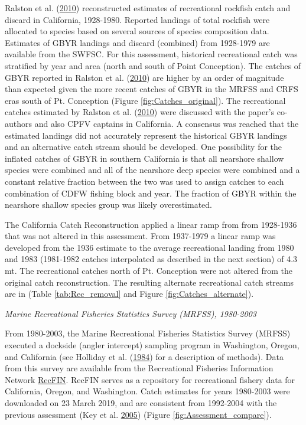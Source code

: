 \documentclass[12pt,]{article}
\begin{document}
Ralston et al. (\protect\hyperlink{ref-Ralston2010}{2010}) reconstructed
estimates of recreational rockfish catch and discard in California,
1928-1980. Reported landings of total rockfish were allocated to species
based on several sources of species composition data. Estimates of GBYR
landings and discard (combined) from 1928-1979 are available from the
SWFSC. For this assessment, historical recreational catch was stratified
by year and area (north and south of Point Conception). The catches of
GBYR reported in Ralston et al.
(\protect\hyperlink{ref-Ralston2010}{2010}) are higher by an order of
magnitude than expected given the more recent catches of GBYR in the
MRFSS and CRFS eras south of Pt. Conception (Figure
\ref{fig:Catches_original}). The recreational catches estimated by
Ralston et al. (\protect\hyperlink{ref-Ralston2010}{2010}) were
discussed with the paper's co-authors and also CPFV captains in
California. A consensus was reached that the estimated landings did not
accurately represent the historical GBYR landings and an alternative
catch stream should be developed. One possibility for the inflated
catches of GBYR in southern California is that all nearshore shallow
species were combined and all of the nearshore deep species were
combined and a constant relative fraction between the two was used to
assign catches to each combination of CDFW fishing block and year. The
fraction of GBYR within the nearshore shallow species group was likely
overestimated.

The California Catch Reconstruction applied a linear ramp from from
1928-1936 that was not altered in this assessment. From 1937-1979 a
linear ramp was developed from the 1936 estimate to the average
recreational landing from 1980 and 1983 (1981-1982 catches interpolated
as described in the next section) of 4.3 mt. The recreational catches
north of Pt. Conception were not altered from the original catch
reconstruction. The resulting alternate recreational catch streams are
in (Table \ref{tab:Rec_removal} and Figure \ref{fig:Catches_alternate}).

\emph{Marine Recreational Fisheries Statistics Survey (MRFSS),
1980-2003}

From 1980-2003, the Marine Recreational Fisheries Statistics Survey
(MRFSS) executed a dockside (angler intercept) sampling program in
Washington, Oregon, and California (see Holliday et al.
(\protect\hyperlink{ref-Holliday1984}{1984}) for a description of
methods). Data from this survey are available from the Recreational
Fisheries Information Network \href{www.recfin.org}{RecFIN}. RecFIN
serves as a repository for recreational fishery data for California,
Oregon, and Washington. Catch estimates for years 1980-2003 were
downloaded on 23 March 2019, and are consistent from 1992-2004 with the
previous assessment (Key et al. \protect\hyperlink{ref-Key2005}{2005})
(Figure \ref{fig:Assessment_compare}).
\end{document}
